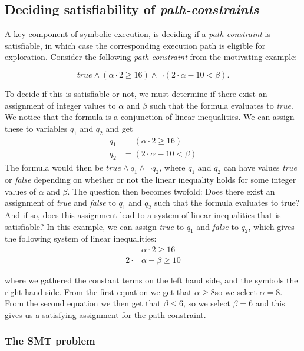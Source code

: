 	\subsection{Deciding satisfiability of \emph{path-constraints}}
	A key component of symbolic execution, is deciding if a \emph{path-constraint} is satisfiable, in which case the corresponding execution path is eligible for exploration. Consider the following \emph{path-constraint} from the motivating example:
	
	\begin{equation}	
		true \land (\alpha \cdot 2 \geq 16) \land \neg (2\cdot \alpha - 10 < \beta).
	\end{equation}
	
	To decide if this is satisfiable or not, we must determine if there exist an assignment of integer values to $\alpha$ and $\beta$ such that the formula evaluates to \emph{true}. We notice that the formula is a conjunction of linear inequalities. We can assign these to variables $q_1$ and $q_2$ and get
	\begin{align}
		q_1 & = (\alpha \cdot 2 \geq 16) \\
		q_2 & = (2\cdot \alpha - 10 < \beta)
	\end{align}
	The formula would then be $true\land q_1 \land \neg q_2$,
	where $q_1$ and $q_2$ can have values \emph{true} or \emph{false} depending on whether or not the linear inequality holds for some integer values of $\alpha$ and $\beta$. The question then becomes twofold: Does there exist an assignment of \emph{true} and \emph{false} to $q_1$ and $q_2$ such that the formula evaluates to true? And if so, does this assignment lead to a system of linear inequalities that is satisfiable?
	In this example, we can assign \emph{true} to $q_1$ and \emph{false} to $q_2$, which gives the following system of linear inequalities:
	\begin{align}
		& \alpha \cdot 2 \geq 16 \\
		2  \cdot & \alpha - \beta \geq 10 
	\end{align}
	
	where we gathered the constant terms on the left hand side, and the symbols the right hand side. From the first equation we get that $\alpha \geq 8$so we select $\alpha = 8$. From the second equation we then get that $\beta \leq 6$, so we select $\beta = 6$ and this gives us a satisfying assignment for the path constraint.	
	\subsubsection{The SMT problem}

